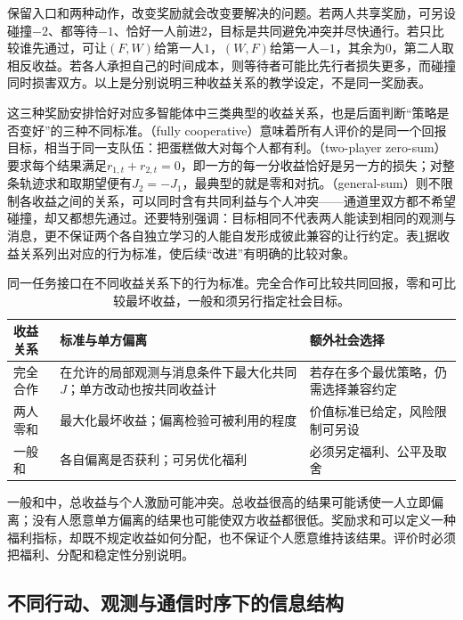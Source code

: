 保留入口和两种动作，改变奖励就会改变要解决的问题。若两人共享奖励，可另设碰撞$-2$、都等待$-1$、恰好一人前进$2$，目标是共同避免冲突并尽快通行。若只比较谁先通过，可让$(F,W)$给第一人$1$，$(W,F)$给第一人$-1$，其余为$0$，第二人取相反收益。若各人承担自己的时间成本，则等待者可能比先行者损失更多，而碰撞同时损害双方。以上是分别说明三种收益关系的教学设定，不是同一奖励表。

这三种奖励安排恰好对应多智能体中三类典型的收益关系，也是后面判断“策略是否变好”的三种不同标准。（fully cooperative）意味着所有人评价的是同一个回报目标，相当于同一支队伍：把蛋糕做大对每个人都有利。（two-player zero-sum）要求每个结果满足$r_{1,t}+r_{2,t}=0$，即一方的每一分收益恰好是另一方的损失；对整条轨迹求和取期望便有$J_2=-J_1$，最典型的就是零和对抗。（general-sum）则不限制各收益之间的关系，可以同时含有共同利益与个人冲突——通道里双方都不希望碰撞，却又都想先通过。还要特别强调：目标相同不代表两人能读到相同的观测与消息，更不保证两个各自独立学习的人能自发形成彼此兼容的让行约定。表\ref{tab:rl-multi-agent-payoffs}据收益关系列出对应的行为标准，使后续“改进”有明确的比较对象。

\begin{table}[htbp]
 \centering
 \begin{tabularx}{\linewidth}{@{}l >{\raggedright\arraybackslash}X >{\raggedright\arraybackslash}X@{}}
 \toprule
 收益关系 & 标准与单方偏离 & 额外社会选择\\
 \midrule
 完全合作 & 在允许的局部观测与消息条件下最大化共同$J$；单方改动也按共同收益计 & 若存在多个最优策略，仍需选择兼容约定\\
 两人零和 & 最大化最坏收益；偏离检验可被利用的程度 & 价值标准已给定，风险限制可另设\\
 一般和 & 各自偏离是否获利；可另优化福利 & 必须另定福利、公平及取舍\\
 \bottomrule
 \end{tabularx}
 \caption{同一任务接口在不同收益关系下的行为标准。完全合作可比较共同回报，零和可比较最坏收益，一般和须另行指定社会目标。}
 \label{tab:rl-multi-agent-payoffs}
\end{table}

一般和中，总收益与个人激励可能冲突。总收益很高的结果可能诱使一人立即偏离；没有人愿意单方偏离的结果也可能使双方收益都很低。奖励求和可以定义一种福利指标，却既不规定收益如何分配，也不保证个人愿意维持该结果。评价时必须把福利、分配和稳定性分别说明。

\subsection{不同行动、观测与通信时序下的信息结构}
\label{sec:rl-multi-agent-information}

